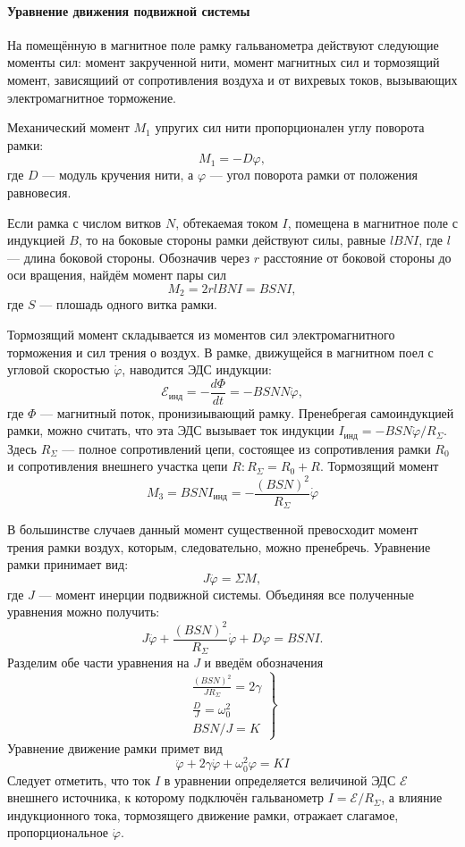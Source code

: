 \documentclass[12pt]{article}
\begin{document}
\paragraph{Уравнение движения подвижной системы}
\par	
	На помещённую в магнитное поле рамку гальванометра действуют следующие моменты сил: момент закрученной нити, момент магнитных сил и тормозящий момент, зависящиий от сопротивления воздуха и от вихревых токов, вызывающих электромагнитное торможение. 
\par
	Механический момент $M_1$ упругих сил нити пропорционален углу поворота рамки:
\[
 	M_1 = -D \varphi,
\]	
где $D$ --- модуль кручения нити, а $\varphi$ --- угол поворота рамки от положения равновесия.
\par	
	Если рамка с числом витков $N$, обтекаемая током $I$, помещена в магнитное поле с индукцией $B$, то на боковые стороны рамки действуют силы, равные $lBNI$, где $l$ --- длина боковой стороны. Обозначив через $r$ расстояние от боковой стороны до оси вращения, найдём момент пары сил
\[
	M_2 = 2 r l B N I = B S N I,
\]	
где $S$ --- плошадь одного витка рамки.
\par
	Тормозящий момент складывается из моментов сил электромагнитного торможения и сил трения о воздух. В рамке, движущейся в магнитном поел с угловой скоростью $\dot\varphi$, наводится ЭДС индукции:
\[
	\mathscr{E}_\text{инд} = - \frac{d\Phi}{dt} = - BSNN\dot\varphi,
\]
где $\Phi$ --- магнитный поток, пронизиывающий рамку. Пренебрегая самоиндукцией рамки, можно считать, что эта ЭДС вызывает ток индукции $I_\text{инд} = -BSN\dot\varphi / R_\Sigma$. Здесь $R_\Sigma $ --- полное сопротивлений цепи, состоящее из сопротивления рамки $R_0$ и сопротивления внешнего участка цепи $R: R_\Sigma =  R_0 + R$. Тормозящий момент
\[
	M_3 = BSNI_\text{инд} = - \frac{\left(BSN\right)^2}{R_\Sigma} \dot\varphi
\]
\par
	В большинстве случаев данный момент существенной превосходит момент трения рамки воздух, которым, следовательно, можно пренебречь. Уравнение рамки принимает вид:
\[
	J \ddot \varphi = \Sigma M,
\]	
где $J$ --- момент инерции подвижной системы.
Объединяя все полученные уравнения можно получить:
\[
	J\ddot \varphi + \frac{\left(BSN\right)^2}{R_\Sigma} \dot \varphi + D \varphi = BSNI.
\]
Разделим обе части уравнения на $J$ и введём обозначения
\begin{equation*}
	\left.
	\begin{aligned}
		\frac{\left(BSN\right)^2}{JR_\Sigma} = 2 \gamma \\
	    \frac{D}{J} = \omega_0^2 \\
	    BSN / J = K
	\end{aligned}
	\right\}
\end{equation*}
Уравнение движение рамки примет вид
\begin{equation}
	\ddot \varphi + 2\gamma \dot \varphi + \omega_0^2\varphi = KI \label{osc}
\end{equation}
Следует отметить, что ток $I$ в уравнении определяется величиной ЭДС $\mathscr{E}$ внешнего источника, к которому подключён гальванометр $I = \mathscr{E} / R_\Sigma $, а влияние индукционного тока, тормозящего движение рамки, отражает слагамое, пропорциональное $\dot \varphi$.
\end{document}
